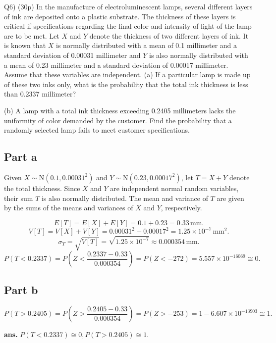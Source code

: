 \documentclass[12pt]{article}
\begin{document}
\begin{q}
Q6) (30p) In the manufacture of electroluminescent lamps, several different layers of ink are deposited onto a plastic substrate. The thickness of these layers is critical if specifications regarding the final color and intensity of light of the lamp are to be met. Let \(X\) and \(Y\) denote the thickness of two different layers of ink. It is known that \(X\) is normally distributed with a mean of 0.1 millimeter and a standard deviation of 0.00031 millimeter and \(Y\) is also normally distributed with a mean of 0.23 millimeter and a standard deviation of 0.00017 millimeter. Assume that these variables are independent.
(a) If a particular lamp is made up of these two inks only, what is the probability that the total ink thickness is less than 0.2337 millimeter?

(b) A lamp with a total ink thickness exceeding 0.2405 millimeters lacks the uniformity of color demanded by the customer. Find the probability that a randomly selected lamp fails to meet customer specifications.
\end{q}


\subsection*{Part a}

Given \( X \sim \mathrm{N}(0.1, 0.00031^2) \) and \( Y \sim \mathrm{N}(0.23, 0.00017^2) \), let \( T = X + Y \) denote the total thickness. Since \( X \) and \( Y \) are independent normal random variables, their sum \( T \) is also normally distributed. The mean and variance of \( T \) are given by the sums of the means and variances of \( X \) and \( Y \), respectively.

\[ E[T] = E[X] + E[Y] = 0.1 + 0.23 = 0.33 \, \text{mm}. \]
\[ V[T] = V[X] + V[Y] = 0.00031^2 + 0.00017^2 = 1.25 \times 10^{-7} \, \text{mm}^2. \]
\[ \sigma_T = \sqrt{V[T]} = \sqrt{1.25 \times 10^{-7}} \approx 0.000354 \, \text{mm}. \]
\[ P(T < 0.2337) = P\left(Z < \frac{0.2337 - 0.33}{0.000354}\right) = P(Z < -272) = 5.557\times 10^{-16069} \cong 0.\]

\AnswerTag

\subsection*{Part b}
\[ P(T > 0.2405) = P\left(Z > \frac{0.2405 - 0.33}{0.000354}\right) = P(Z > -253) = 1-6.607 \times 10^{-13903} \cong 1.\]
\AnswerTag

\vfill
\begin{flushright}
\textbf{ans.} \(P(T < 0.2337)\cong 0, P(T > 0.2405) \cong 1.\)
\end{flushright}
\end{document}
